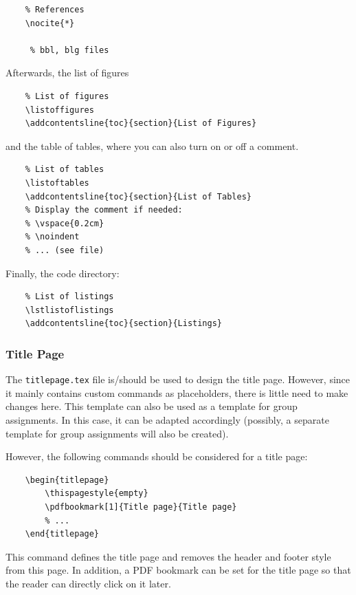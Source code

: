 \begin{verbatim}
    % References
    \nocite{*}
    
     % bbl, blg files
\end{verbatim}

Afterwards, the list of figures

\begin{verbatim}
    % List of figures
    \listoffigures
    \addcontentsline{toc}{section}{List of Figures}
\end{verbatim}

and the table of tables, where you can also turn on or off a comment.

\begin{verbatim}
    % List of tables
    \listoftables
    \addcontentsline{toc}{section}{List of Tables}
    % Display the comment if needed:
    % \vspace{0.2cm}
    % \noindent
    % ... (see file)
\end{verbatim}

Finally, the code directory:

\begin{verbatim}
    % List of listings
    \lstlistoflistings
    \addcontentsline{toc}{section}{Listings}
\end{verbatim}


\subsubsection{Title Page}

The \verb|titlepage.tex| file is/should be used to design the title page. However, since it mainly contains custom commands as placeholders, there is little need to make changes here. This template can also be used as a template for group assignments. In this case, it can be adapted accordingly (possibly, a separate template for group assignments will also be created).

However, the following commands should be considered for a title page:

\begin{verbatim}
    \begin{titlepage}
        \thispagestyle{empty}
	    \pdfbookmark[1]{Title page}{Title page}
        % ...
    \end{titlepage}
\end{verbatim}

This command defines the title page and removes the header and footer style from this page. In addition, a PDF bookmark can be set for the title page so that the reader can directly click on it later.

